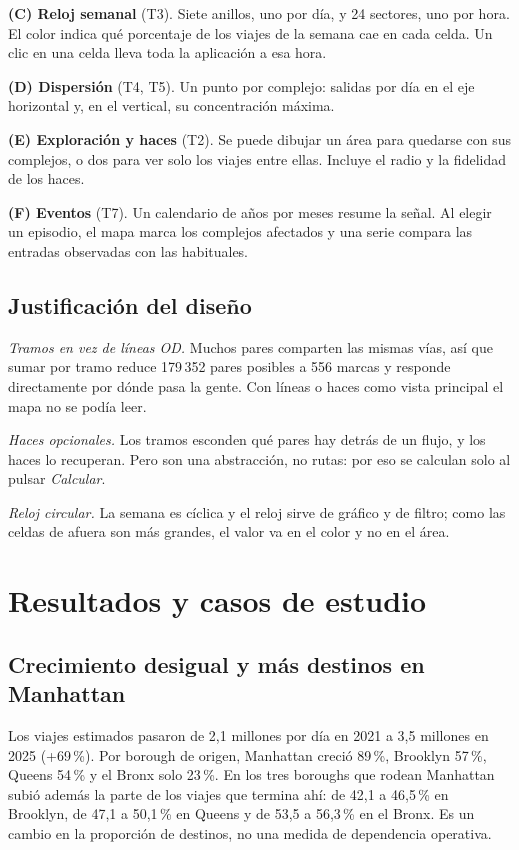 \documentclass[conference,a4paper]{IEEEtran}
\begin{document}
\textbf{(C) Reloj semanal} (T3). Siete anillos, uno por día, y 24 sectores, uno por hora. El color indica qué porcentaje de los viajes de la semana cae en cada celda. Un clic en una celda lleva toda la aplicación a esa hora.

\textbf{(D) Dispersión} (T4, T5). Un punto por complejo: salidas por día en el eje horizontal y, en el vertical, su concentración máxima.

\textbf{(E) Exploración y haces} (T2). Se puede dibujar un área para quedarse con sus complejos, o dos para ver solo los viajes entre ellas. Incluye el radio y la fidelidad de los haces.

\textbf{(F) Eventos} (T7). Un calendario de años por meses resume la señal. Al elegir un episodio, el mapa marca los complejos afectados y una serie compara las entradas observadas con las habituales.

\subsection{Justificación del diseño}
\emph{Tramos en vez de líneas OD.} Muchos pares comparten las mismas vías, así que sumar por tramo reduce 179\,352 pares posibles a 556 marcas y responde directamente por dónde pasa la gente. Con líneas o haces como vista principal el mapa no se podía leer.

\emph{Haces opcionales.} Los tramos esconden qué pares hay detrás de un flujo, y los haces lo recuperan. Pero son una abstracción, no rutas: por eso se calculan solo al pulsar \emph{Calcular}.

\emph{Reloj circular.} La semana es cíclica y el reloj sirve de gráfico y de filtro; como las celdas de afuera son más grandes, el valor va en el color y no en el área.


\section{Resultados y casos de estudio}
\subsection{Crecimiento desigual y más destinos en Manhattan}
Los viajes estimados pasaron de 2,1 millones por día en 2021 a 3,5 millones en 2025 (+69\,\%). Por borough de origen, Manhattan creció 89\,\%, Brooklyn 57\,\%, Queens 54\,\% y el Bronx solo 23\,\%. En los tres boroughs que rodean Manhattan subió además la parte de los viajes que termina ahí: de 42,1 a 46,5\,\% en Brooklyn, de 47,1 a 50,1\,\% en Queens y de 53,5 a 56,3\,\% en el Bronx. Es un cambio en la proporción de destinos, no una medida de dependencia operativa.
\end{document}
